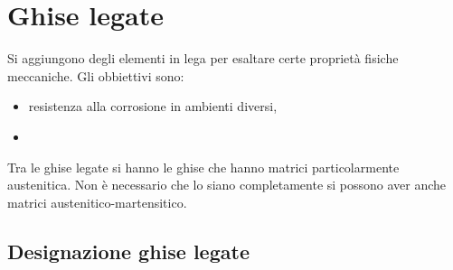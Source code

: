 \section{Ghise legate}
Si aggiungono degli elementi in lega per esaltare certe proprietà fisiche meccaniche.
Gli obbiettivi sono:
\begin{itemize}
\item resistenza alla corrosione in ambienti diversi,
\item \todo{\\Completa}
\end{itemize}
Tra le ghise legate si hanno le ghise che hanno matrici particolarmente austenitica. Non è necessario che lo siano completamente si possono aver anche matrici austenitico-martensitico.

\subsection{Designazione ghise legate}
